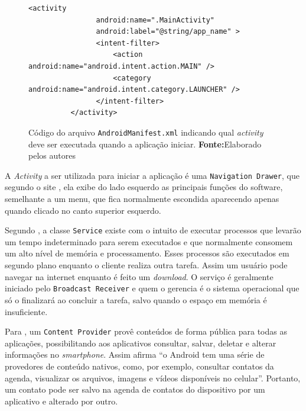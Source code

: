 	\begin{figure}[h!]
		\begin{lstlisting}[style=custom_XML]
		  <activity
	            android:name=".MainActivity"
	            android:label="@string/app_name" >
	            <intent-filter>
	                <action android:name="android.intent.action.MAIN" />
	                <category android:name="android.intent.category.LAUNCHER" />
	            </intent-filter>
	      </activity>
		\end{lstlisting}
		\caption[Código do arquivo
		AndroidManifest.xml indicando qual activity deve ser executada quando a
		aplicação iniciar]{Código do arquivo \texttt{AndroidManifest.xml} indicando
		qual \textit{activity} deve ser executada quando a aplicação iniciar.
		 \textbf{Fonte:}Elaborado pelos autores}
		\label{fig:qt2}
	\end{figure}
	
	\par A \textit{Activity} a ser utilizada para iniciar a aplicação é uma
\texttt{Navigation Drawer}, que segundo o site , ela exibe
do lado esquerdo as principais funções do software, semelhante a um
menu, que fica normalmente escondida aparecendo apenas quando clicado no canto
superior esquerdo. 

	\par Segundo , a classe \texttt{Service} existe com o intuito
de executar processos que levarão um tempo indeterminado para serem executados
e que normalmente consomem um alto nível de memória e processamento. Esses
processos são executados em segundo plano enquanto o cliente realiza outra
tarefa. Assim um usuário pode navegar na internet enquanto é feito um
\textit{download}. O serviço é geralmente iniciado pelo \texttt{Broadcast Receiver} e
quem o gerencia é o sistema operacional que só o finalizará ao concluir a
tarefa, salvo quando o espaço em memória é insuficiente.

	\par Para , um \texttt{Content Provider} provê conteúdos de
forma pública para todas as aplicações, possibilitando aos aplicativos consultar,
salvar, deletar e alterar informações no \textit{smartphone}. Assim afirma
 “o Android tem uma série de provedores de
conteúdo nativos, como, por exemplo, consultar contatos da agenda, visualizar
os arquivos, imagens e vídeos disponíveis no celular”. Portanto, um contato
pode ser salvo na agenda de contatos do dispositivo por um aplicativo e
alterado por outro.

